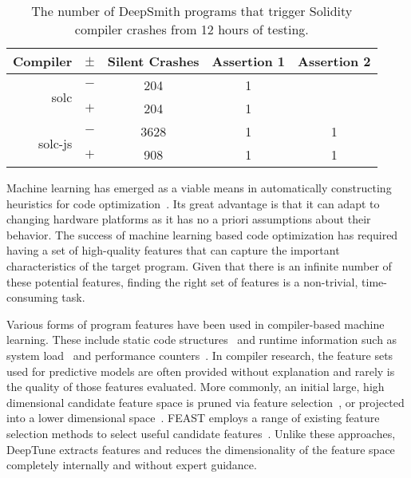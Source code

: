 \begin{table}
	\footnotesize %
	\centering %
	\caption{%
		The number of DeepSmith programs that trigger Solidity compiler crashes from
		12 hours of testing.%
		\vspace{-1em}
	}
	\begin{tabular}{rc|ccc}
		\toprule
		\textbf{Compiler} & $\pm$ & \textbf{Silent Crashes} & \textbf{Assertion 1} & \textbf{Assertion 2}\\
		\midrule
		\multirow{ 2}{*}{solc}    & $-$ & 204 & 1 & \\
		& $+$ & 204 & 1 & \\
		\hline
		\multirow{ 2}{*}{solc-js} & $-$ & 3628 & 1 & 1\\
		& $+$ & 908 & 1 & 1\\
		\bottomrule
	\end{tabular}
	\vspace{-2em}
	\label{tab:solidity}
\end{table}




Machine learning has emerged as a viable means in automatically constructing heuristics for code optimization~\cite{Wang2010,Kulkarni2012,Muralidharan2016,Ogilvie2017,Ren,Cummins2016}. Its great advantage is that it can adapt to changing hardware platforms as it has no a priori assumptions about their behavior. The success of machine learning based code optimization has required having a set of high-quality features that can capture the important characteristics of the target program. Given that there is an infinite number of these potential features, finding the right set of features is a non-trivial, time-consuming task.

Various forms of program features have been used in compiler-based machine learning. These include static code structures~\cite{Jiang2010} and runtime information such as system load~\cite{Wen2015} and performance counters~\cite{Dubach2009}. In compiler research, the feature sets used for predictive models are often provided without explanation and rarely is the quality of those features evaluated. More commonly, an initial large, high dimensional candidate feature space is pruned via feature selection~\cite{Stephenson2005,Taylor}, or projected into a lower dimensional space~\cite{Collins2013,Dubach2007}. FEAST employs a range of existing feature selection methods to select useful candidate features~\cite{Ting2016}. Unlike these approaches, DeepTune extracts features and reduces the dimensionality of the feature space completely internally and without expert guidance.

